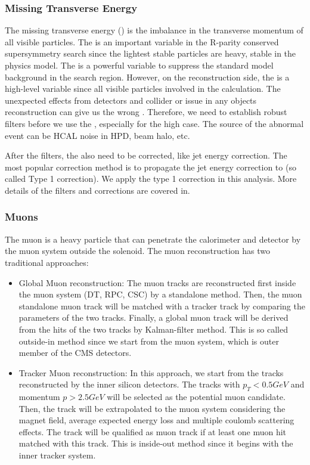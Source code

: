 \subsubsection{Missing Transverse Energy}

The missing transverse energy (\MET) is the imbalance in the transverse momentum of all visible particles. The \MET is an important variable in the R-parity conserved supersymmetry search since the lightest stable particles are heavy, stable in the physics model. The \MET is a powerful variable to suppress the standard model background in the search region. 
However, on the reconstruction side, the \MET is a high-level variable since all visible particles involved in the calculation. The unexpected effects from detectors and collider or issue in any objects reconstruction can give us the wrong \MET. Therefore, we need to establish robust \MET filters before we use the \MET, especially for the high \MET case. The source of the abnormal \MET event can be HCAL noise in HPD, beam halo, etc. 

After the filters, the \MET also need to be corrected, like jet energy correction. The most popular correction method is to propagate the jet energy correction to \MET (so called Type 1 correction). We apply the type 1 correction in this analysis. More details of the \MET filters and corrections are covered in\cite{CMS-PAS-JME-16-004}. 


\subsubsection{Muons}
The muon is a heavy particle that can penetrate the calorimeter and detector by the muon system outside the solenoid. The muon reconstruction has two traditional approaches: 

\begin{itemize}
	\item Global Muon reconstruction: The muon tracks are reconstructed first inside the muon system (DT, RPC, CSC) by a standalone method. Then, the muon standalone muon track will be matched with a tracker track by comparing the parameters of the two tracks. Finally, a global muon track will be derived from the hits of the two tracks by Kalman-filter method\cite{Fruhwirth:1987fm}. This is so called outside-in method since we start from the muon system, which is outer member of the CMS detectors. 
  \item Tracker Muon reconstruction: In this approach, we start from the tracks reconstructed by the inner silicon detectors. The tracks with $p_{T}<0.5 GeV$ and momentum $p>2.5GeV$ will be selected as the potential muon candidate. Then, the track will be extrapolated to the muon system considering the magnet field, average expected energy loss and multiple coulomb scattering effects. The track will be qualified as muon track if at least one muon hit matched with this track. This is inside-out method since it begins with the inner tracker system. 
\end{itemize}

